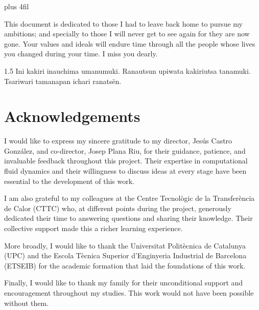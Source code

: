 \strut\vskip 0pt plus 4fil
\thispagestyle{empty}

\begin{flushright}
    This document is dedicated to those I had to leave back home to pursue my ambitions; and specially to those I will never get to see again for they are now gone. Your values and ideals will endure time through all the people whose lives you changed during your time. I miss you dearly. 
\end{flushright}

\vspace{1cm}

\begin{spacing}{1.5}
    Ini kakiri inauchima umanumuki. Ranautsun upiwata kakiriutsa tanamuki. Tsariwari tamanapan ichari ranatsën.
\end{spacing}

\section*{Acknowledgements}

I would like to express my sincere gratitude to my director, Jes\'{u}s Castro Gonz\'{a}lez, and
co-director, Josep Plana Riu, for their guidance, patience, and invaluable feedback
throughout this project. Their expertise in computational fluid dynamics and their
willingness to discuss ideas at every stage have been essential to the development of this
work.

I am also grateful to my colleagues at the Centre Tecnol\`{o}gic de la Transfer\`{e}ncia de Calor
(CTTC) who, at different points during the project, generously dedicated their time to
answering questions and sharing their knowledge. Their collective support made this a
richer learning experience.

More broadly, I would like to thank the Universitat Polit\`{e}cnica de Catalunya (UPC) and the
Escola T\`{e}cnica Superior d'Enginyeria Industrial de Barcelona (ETSEIB) for the academic
formation that laid the foundations of this work.

Finally, I would like to thank my family for their unconditional support and encouragement
throughout my studies. This work would not have been possible without them.

\tableofcontents
\listoffigures
\listoftables

